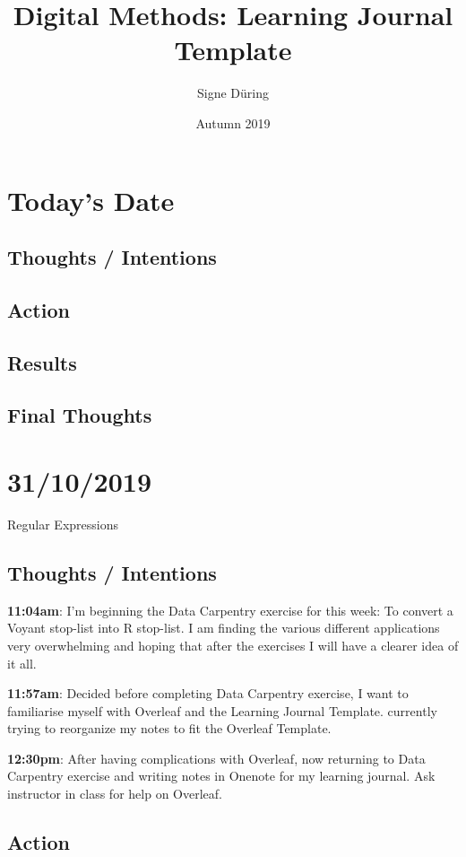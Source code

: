 \documentclass{article}
\title{Digital Methods: Learning Journal Template}
\author{Signe Düring}
\date{Autumn 2019}
\begin{document}
\maketitle

\section{Today's Date}
\subsection{Thoughts / Intentions}
\subsection{Action}
\subsection{Results}
\subsection{Final Thoughts}

\pagebreak{}

\section{31/10/2019}
Regular Expressions
\subsection{Thoughts / Intentions}

\textbf{11:04am}: I’m beginning the Data Carpentry exercise for this week: To convert a Voyant stop-list into R stop-list. I am finding the various different applications very overwhelming and hoping that after the exercises I will have a clearer idea of it all. 

\textbf{11:57am}: Decided before completing Data Carpentry exercise, I want to familiarise myself with Overleaf and the Learning Journal Template. currently trying to reorganize my notes to fit the Overleaf Template.


\textbf{12:30pm}: After having complications with Overleaf, now returning to Data Carpentry exercise and writing notes in Onenote for my learning journal. 
Ask instructor in class for help on Overleaf. 

\subsection{Action}
\end{document}
